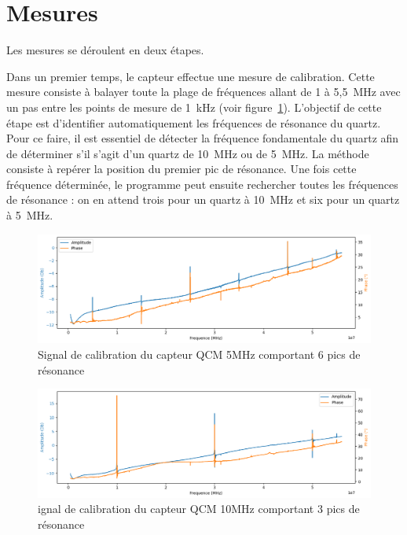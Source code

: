 
\newpage

\section{Mesures}

Les mesures se déroulent en deux étapes.

Dans un premier temps, le capteur effectue une mesure de calibration. Cette mesure consiste à balayer toute la plage de fréquences allant de 1 à 5{,}5~MHz avec un pas entre les points de mesure de 1~kHz (voir figure~\ref{fig:calibration 5MHz plot}).  
L’objectif de cette étape est d’identifier automatiquement les fréquences de résonance du quartz. Pour ce faire, il est essentiel de détecter la fréquence fondamentale du quartz afin de déterminer s’il s’agit d’un quartz de 10~MHz ou de 5~MHz.  
La méthode consiste à repérer la position du premier pic de résonance. Une fois cette fréquence déterminée, le programme peut ensuite rechercher toutes les fréquences de résonance : on en attend trois pour un quartz à 10~MHz et six pour un quartz à 5~MHz.

\begin{figure}[H]
    \centering
    \includegraphics[width=\textwidth]{assets/figures/5MhzCalibration.png}
    \caption{Signal de calibration du capteur QCM 5MHz comportant 6 pics de résonance}
    \label{fig:calibration 5MHz plot}
\end{figure}

\begin{figure}[H]
    \centering
    \includegraphics[width=\textwidth]{assets/figures/10MHzCalibration.png}
    \caption{ignal de calibration du capteur QCM 10MHz comportant 3 pics de résonance}
    \label{fig:harmonic 10MHz Calibration}
\end{figure}

